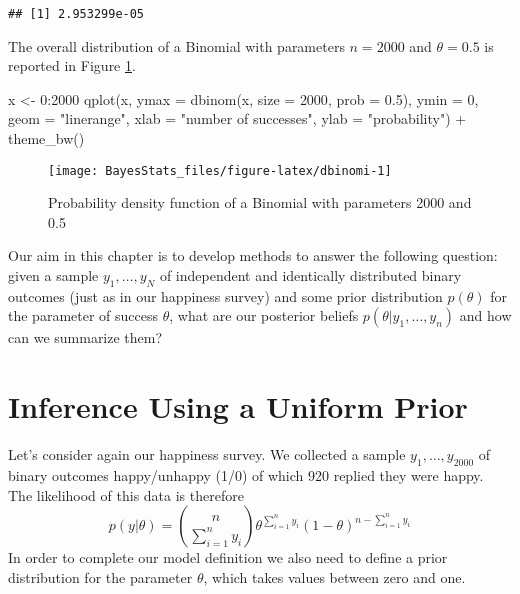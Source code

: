 \documentclass[
]{book}
\newenvironment{Shaded}{\begin{snugshade}}{\end{snugshade}}
\newcommand{\AttributeTok}[1]{\textcolor[rgb]{0.77,0.63,0.00}{#1}}
\newcommand{\DecValTok}[1]{\textcolor[rgb]{0.00,0.00,0.81}{#1}}
\newcommand{\FloatTok}[1]{\textcolor[rgb]{0.00,0.00,0.81}{#1}}
\newcommand{\FunctionTok}[1]{\textcolor[rgb]{0.00,0.00,0.00}{#1}}
\newcommand{\NormalTok}[1]{#1}
\newcommand{\OtherTok}[1]{\textcolor[rgb]{0.56,0.35,0.01}{#1}}
\newcommand{\SpecialCharTok}[1]{\textcolor[rgb]{0.00,0.00,0.00}{#1}}
\newcommand{\StringTok}[1]{\textcolor[rgb]{0.31,0.60,0.02}{#1}}
\begin{document}
\begin{verbatim}
## [1] 2.953299e-05
\end{verbatim}

The overall distribution of a Binomial with parameters \(n=2000\) and \(\theta = 0.5\) is reported in Figure \ref{fig:dbinomi}.

\begin{Shaded}
\begin{Highlighting}[]
\NormalTok{x }\OtherTok{\textless{}{-}} \DecValTok{0}\SpecialCharTok{:}\DecValTok{2000}
\FunctionTok{qplot}\NormalTok{(x, }\AttributeTok{ymax =} \FunctionTok{dbinom}\NormalTok{(x, }\AttributeTok{size =} \DecValTok{2000}\NormalTok{, }\AttributeTok{prob =} \FloatTok{0.5}\NormalTok{), }\AttributeTok{ymin =} \DecValTok{0}\NormalTok{, }
      \AttributeTok{geom =} \StringTok{"linerange"}\NormalTok{,  }\AttributeTok{xlab =} \StringTok{"number of successes"}\NormalTok{, }\AttributeTok{ylab =} \StringTok{"probability"}\NormalTok{) }\SpecialCharTok{+}
  \FunctionTok{theme\_bw}\NormalTok{()}
\end{Highlighting}
\end{Shaded}

\begin{figure}

{\centering \texttt{[image: BayesStats\_files/figure-latex/dbinomi-1]} 

}

\caption{Probability density function of a Binomial with parameters 2000 and 0.5}\label{fig:dbinomi}
\end{figure}

Our aim in this chapter is to develop methods to answer the following question: given a sample \(y_1,\dots,y_N\) of independent and identically distributed binary outcomes (just as in our happiness survey) and some prior distribution \(p(\theta)\) for the parameter of success \(\theta\), what are our posterior beliefs \(p(\theta|y_1,\dots,y_n)\) and how can we summarize them?

\hypertarget{inference-using-a-uniform-prior}{%
\section{Inference Using a Uniform Prior}\label{inference-using-a-uniform-prior}}

Let's consider again our happiness survey. We collected a sample \(y_1,\dots,y_{2000}\) of binary outcomes happy/unhappy (1/0) of which 920 replied they were happy. The likelihood of this data is therefore
\[
p(y|\theta)=\binom{n}{\sum_{i=1}^ny_i}\theta^{\sum_{i=1}^ny_i}(1-\theta)^{n-\sum_{i=1}^ny_i}
\]
In order to complete our model definition we also need to define a prior distribution for the parameter \(\theta\), which takes values between zero and one.
\end{document}
